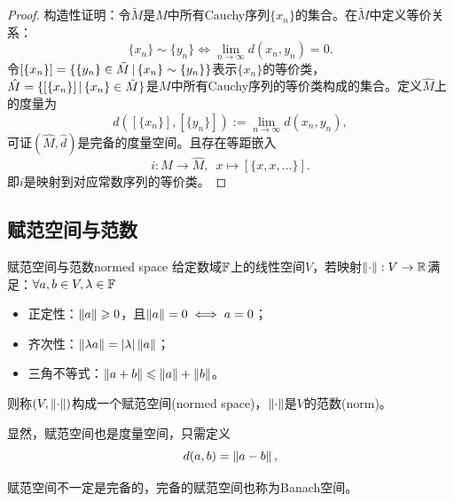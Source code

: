 \begin{proof}
    构造性证明：令$\tilde M$是$M$中所有Cauchy序列$\{x_n\}$的集合。在$\tilde M$中定义等价关系：
    \[
        \{x_n\}\sim\{y_n\}\iff\lim_{n\to\infty}d(x_n,y_n)=0.
    \]
    令$[\{x_n\}]=\{\{y_n\}\in\tilde M\,|\,\{x_n\}\sim\{y_n\}\}$表示$\{x_n\}$的等价类，$\hat M=\{[\{x_n\}]\,|\,\{x_n\}\in\tilde M\}$是$M$中所有Cauchy序列的等价类构成的集合。定义$\hat M$上的度量为
    \[
        \hat d([\{x_n\}],[\{y_n\}]):=\lim_{n\to\infty}d(x_n,y_n),
    \]
    可证$(\hat M,\hat d)$是完备的度量空间。且存在等距嵌入
    \[
        i:M\to\hat M,\enspace x\mapsto[\{x,x,\ldots\}].
    \]
    即$i$是映射到对应常数序列的等价类。
\end{proof}

\subsection{赋范空间与范数}

\begin{definition}
    {赋范空间与范数}{normed space}
    给定数域$\mathbb F$上的线性空间$V$，若映射$\left\lVert\cdot\right\rVert:V\to\mathbb R$满足：$\forall a,b\in V,\lambda\in\mathbb F$
    \begin{itemize}
        \item 正定性：$\left\lVert a\right\rVert\geqslant 0$，且$\left\lVert a\right\rVert=0\iff a=0$；
        \item 齐次性：$\left\lVert\lambda a\right\rVert=\left\lvert\lambda\right\rvert\left\lVert a\right\rVert$；
        \item 三角不等式：$\left\lVert a+b\right\rVert\leqslant\left\lVert a\right\rVert+\left\lVert b\right\rVert$。
    \end{itemize}
    则称$(V,\left\lVert\cdot\right\rVert)$构成一个赋范空间(normed space)，$\left\lVert\cdot\right\rVert$是$V$的范数(norm)。
\end{definition}

\begin{corollary}
    显然，赋范空间也是度量空间，只需定义
    \[
        d(a,b)=\left\lVert a-b\right\rVert,
    \]
\end{corollary}
\begin{remark}
    赋范空间不一定是完备的，完备的赋范空间也称为Banach空间。
\end{remark}

